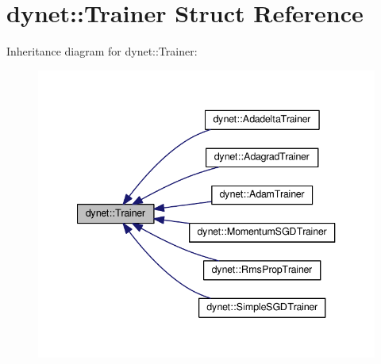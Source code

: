 \hypertarget{structdynet_1_1Trainer}{}\section{dynet\+:\+:Trainer Struct Reference}
\label{structdynet_1_1Trainer}


Inheritance diagram for dynet\+:\+:Trainer\+:\nopagebreak
\begin{figure}[H]
\begin{center}
\leavevmode
\includegraphics[width=340pt]{structdynet_1_1Trainer__inherit__graph}
\end{center}
\end{figure}

